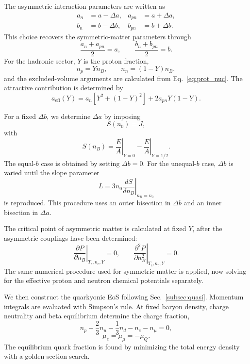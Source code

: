 \documentclass[twocolumn,floatfix,superscriptaddress,a4paper,showkeys,nofootinbib,reprint]{revtex4-1}
\begin{document}
The asymmetric interaction parameters are written as
\begin{align}
    a_n &= a-\Delta a, & a_{pn} &= a+\Delta a, \\
    b_n &= b-\Delta b, & b_{pn} &= b+\Delta b .
\end{align}
This choice recovers the symmetric-matter parameters through
\begin{equation}
    \frac{a_n+a_{pn}}{2}=a,
    \qquad
    \frac{b_n+b_{pn}}{2}=b.
\end{equation}
For the hadronic sector, \(Y\) is the proton fraction,
\begin{equation}
    n_p=Y n_B,
    \qquad
    n_n=(1-Y)n_B,
\end{equation}
and the excluded-volume arguments are calculated from
Eq.~\ref{eq:prot_nuc}. The attractive contribution is determined by
\begin{equation}
    a_{\mathrm{eff}}(Y)
    =
    a_n\left[Y^2+(1-Y)^2\right]
    +2a_{pn}Y(1-Y).
\end{equation}

For a fixed \(\Delta b\), we determine \(\Delta a\) by imposing
\begin{equation}
    S(n_0)=J,
\end{equation}
with
\begin{equation}
    S(n_B)
    =
    \left.\frac{E}{A}\right|_{Y=0}
    -
    \left.\frac{E}{A}\right|_{Y=1/2}.
\end{equation}
The equal-\(b\) case is obtained by setting \(\Delta b=0\). For the
unequal-\(b\) case, \(\Delta b\) is varied until the slope parameter
\begin{equation}
    L=3n_0\left.\frac{dS}{dn_B}\right|_{n_B=n_0}
\end{equation}
is reproduced. This procedure uses an outer bisection in \(\Delta b\)
and an inner bisection in \(\Delta a\).

The critical point of asymmetric matter is calculated at fixed \(Y\),
after the asymmetric couplings have been determined:
\begin{equation}
    \left.\frac{\partial P}{\partial n_B}\right|_{T_c,n_c,Y}=0,
    \qquad
    \left.\frac{\partial^2P}{\partial n_B^2}\right|_{T_c,n_c,Y}=0.
\end{equation}
The same numerical procedure used for symmetric matter is applied, now
solving for the effective proton and neutron chemical potentials
separately.

We then construct the quarkyonic EoS following
Sec.~\ref{subsec:quasi}. Momentum integrals are evaluated with
Simpson's rule. At fixed baryon density, charge neutrality and beta
equilibrium determine the charge fraction,
\begin{equation}
    n_p+\frac{2}{3}n_u-\frac{1}{3}n_d-n_e-n_\mu=0,
\end{equation}
\begin{equation}
    \mu_e=\mu_\mu=-\mu_Q.
\end{equation}
The equilibrium quark fraction is found by minimizing the total energy
density with a golden-section search.
\end{document}
